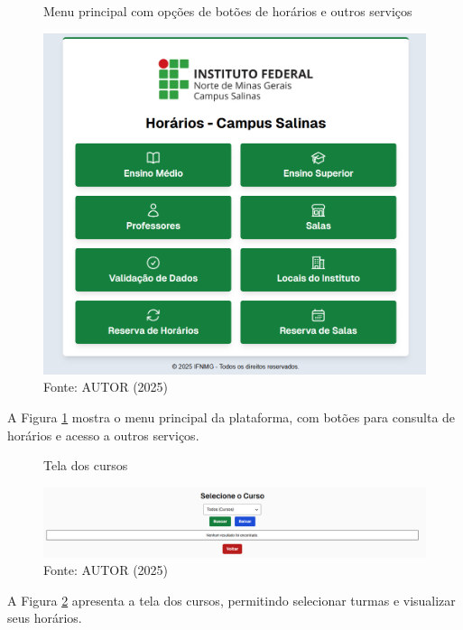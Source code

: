 \begin{figure}[htb]
    \centering
    \caption{Menu principal com opções de botões de horários e outros serviços}
    \includegraphics[width=1\textwidth]{Figuras/front-1.png}
    \caption*{Fonte: AUTOR (2025)}
    \label{fig_front_1}
\end{figure}

A Figura \ref{fig_front_1} mostra o menu principal da plataforma, com botões para consulta de horários e acesso a outros serviços.

\begin{figure}[htb]
    \centering
    \caption{Tela dos cursos}
    \includegraphics[width=1\textwidth]{Figuras/front-2.png}
    \caption*{Fonte: AUTOR (2025)}
    \label{fig_front_2}
\end{figure}

A Figura \ref{fig_front_2} apresenta a tela dos cursos, permitindo selecionar turmas e visualizar seus horários.

